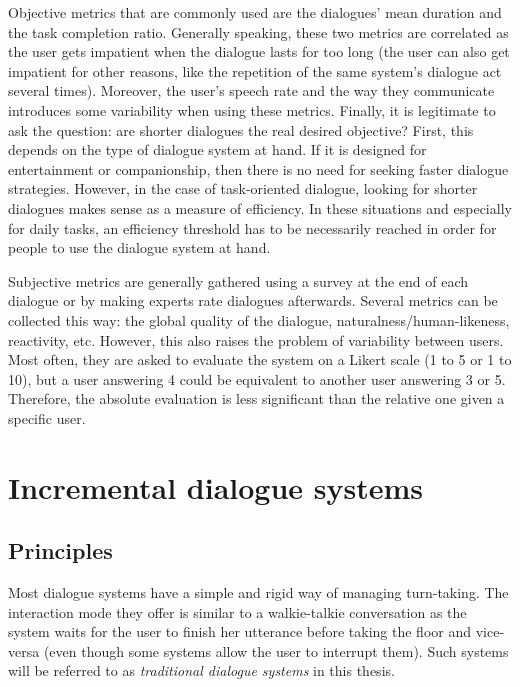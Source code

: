                         Objective metrics that are commonly used are the dialogues' mean duration and the task completion ratio. Generally speaking, these two metrics are correlated as the user gets impatient when the dialogue lasts for too long (the user can also get impatient for other reasons, like the repetition of the same system's dialogue act several times). Moreover, the user's speech rate and the way they communicate introduces some variability when using these metrics. Finally, it is legitimate to ask the question: are shorter dialogues the real desired objective? First, this depends on the type of dialogue system at hand. If it is designed for entertainment or companionship, then there is no need for seeking faster dialogue strategies. However, in the case of task-oriented dialogue, looking for shorter dialogues makes sense as a measure of efficiency. In these situations and especially for daily tasks, an efficiency threshold has to be necessarily reached in order for people to use the dialogue system at hand.

                        Subjective metrics are generally gathered using a survey at the end of each dialogue or by making experts rate dialogues afterwards. Several metrics can be collected this way: the global quality of the dialogue, naturalness/human-likeness, reactivity, etc. However, this also raises the problem of variability between users. Most often, they are asked to evaluate the system on a Likert scale (1 to 5 or 1 to 10), but a user answering 4 could be equivalent to another user answering 3 or 5. Therefore, the absolute evaluation is less significant than the relative one given a specific user.
                        

\section{Incremental dialogue systems}

\subsection{Principles}

    Most dialogue systems have a simple and rigid way of managing turn-taking. The interaction mode they offer is similar to a walkie-talkie conversation as the system waits for the user to finish her utterance before taking the floor and vice-versa (even though some systems allow the user to interrupt them). Such systems will be referred to as \textit{traditional dialogue systems} in this thesis.
    

